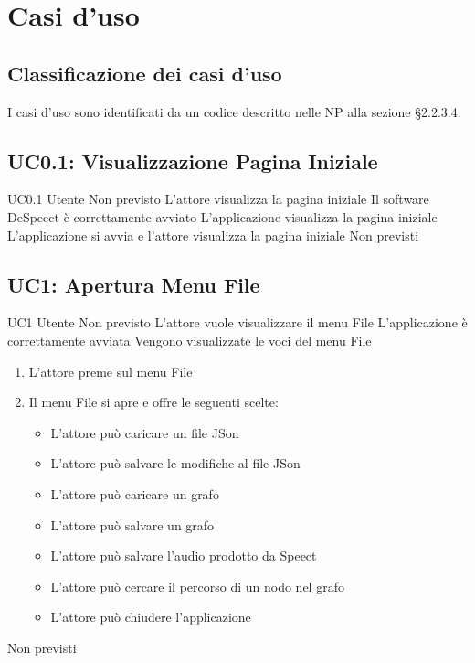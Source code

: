 \documentclass[../AnalisideiRequisiti.tex]{subfiles}
\begin{document}

	\chapter{Casi d'uso}
	\section{Classificazione dei casi d'uso}
	I casi d'uso sono identificati da un codice descritto nelle NP alla sezione §2.2.3.4. 
	
	\section{UC0.1: Visualizzazione Pagina Iniziale}
	\UserCase
	{UC0.1}
	{Utente}
	{Non previsto}
	{L'attore visualizza la pagina iniziale}
	{Il software DeSpeect è correttamente avviato }
	{L'applicazione visualizza la pagina iniziale}
	{L'applicazione si avvia e l'attore visualizza la pagina iniziale}
	{Non previsti}
	
	\section{UC1: Apertura Menu File}
	\UserCase
	{UC1}
	{Utente}
	{Non previsto}
	{L'attore vuole visualizzare il menu File}
	{L'applicazione è correttamente avviata }
	{Vengono visualizzate le voci del menu File}
	{	\begin{enumerate}
			\item{} L'attore preme sul menu File
			\item{} Il menu File si apre e offre le seguenti scelte:
		\begin{itemize}
		\item{} L'attore può caricare un file JSon 
		\item{} L'attore può salvare le modifiche al file JSon 
		\item{} L'attore può caricare un grafo 
		\item{} L'attore può salvare un grafo 
		\item{} L'attore può salvare l'audio prodotto da Speect 
		\item{} L'attore può cercare il percorso di un nodo nel grafo 
		\item{} L'attore può chiudere l'applicazione 
		\end{itemize}
	\end{enumerate}
	}
	{Non previsti}
\end{document}
